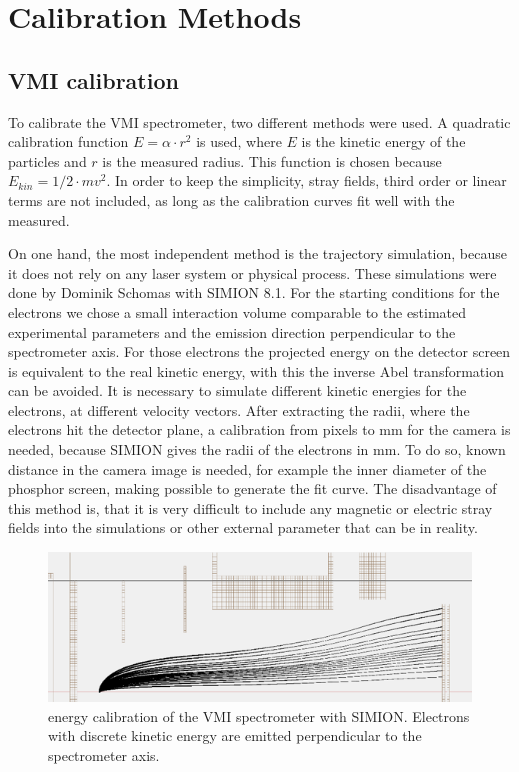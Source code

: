 \section{Calibration Methods}

\subsection{VMI calibration}

To calibrate the VMI spectrometer, two different methods were used. A quadratic calibration function $E=\alpha\cdot r^2$ is used, where $E$ is the kinetic energy of the particles and $r$ is the measured radius. This function is chosen because $E_{kin}=1/2 \cdot m v^2$. In order to keep the simplicity, stray fields, third order or linear terms are not included, as long as the calibration curves fit well with the measured.

On one hand, the most independent method is the trajectory simulation, because it does not rely on any laser system or physical process. These simulations were done by Dominik Schomas with SIMION 8.1. For the starting conditions for the electrons we chose a small interaction volume comparable to the estimated experimental parameters and the emission direction perpendicular to the spectrometer axis. For those electrons the projected energy on the detector screen is equivalent to the real kinetic energy, with this the inverse Abel transformation can be avoided. It is necessary to simulate different kinetic energies for the electrons, at different velocity vectors. After extracting the radii, where the electrons hit the detector plane, a calibration from pixels to mm for the camera is needed, because SIMION gives the radii of the electrons in mm. To do so, known distance in the camera image is needed, for example the inner diameter of the phosphor screen, making possible to generate the fit curve. The disadvantage of this method is, that it is very difficult to include any magnetic or electric stray fields into the simulations or other external parameter that can be in reality.

\begin{figure}[h!]
\centering
\includegraphics[scale=1]{../images/simion_calib.png}
\caption{energy calibration of the VMI spectrometer with SIMION. Electrons with discrete kinetic energy are emitted perpendicular to the spectrometer axis.}
\end{figure}



